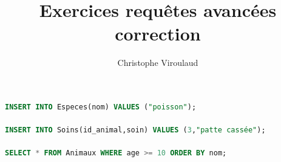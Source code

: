 \documentclass[svgnames,11pt]{beamer}
\author[]{Christophe Viroulaud}
\title{Exercices requêtes avancées\\correction}
\date{\framebox{\textbf{BDD 07}}}
\institute{Terminale - NSI}
\begin{document}
\begin{frame}
\titlepage
\end{frame}
\begin{frame}[fragile]
    \frametitle{}

\begin{center}
\begin{lstlisting}[language=SQL , basicstyle=\ttfamily\small, xleftmargin=1em, xrightmargin=0em]
INSERT INTO Especes(nom) VALUES ("poisson");
\end{lstlisting}
\label{CODE}
\end{center}

\end{frame}
\begin{frame}[fragile]
    \frametitle{}

\begin{center}
\begin{lstlisting}[language=SQL , basicstyle=\ttfamily\small, xleftmargin=1em, xrightmargin=0em]
INSERT INTO Soins(id_animal,soin) VALUES (3,"patte cassée");
\end{lstlisting}
\label{CODE}
\end{center}

\end{frame}
\begin{frame}[fragile]
    \frametitle{}

\begin{center}
\begin{lstlisting}[language=SQL , basicstyle=\ttfamily\small, xleftmargin=1em, xrightmargin=0em]
SELECT * FROM Animaux WHERE age >= 10 ORDER BY nom;
\end{lstlisting}
\label{CODE}
\end{center}

\end{frame}
\end{document}
